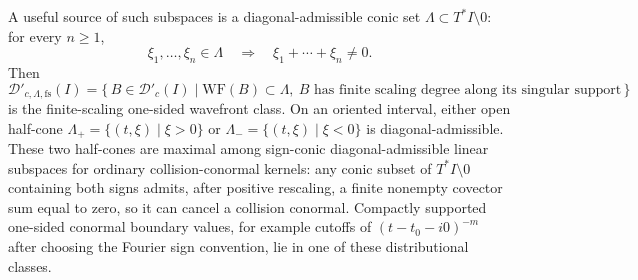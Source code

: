 \begin{defn}
  A useful source of such subspaces is a diagonal-admissible conic set
  \(\Lambda\subset T^*I\setminus0\): for every \(n\geq1\),
  \[
    \xi_1,\ldots,\xi_n\in\Lambda
    \quad\Longrightarrow\quad
    \xi_1+\cdots+\xi_n\neq0 .
  \]
  Then
  \[
    \mathcal D'_{c,\Lambda,\mathrm{fs}}(I)
      =
      \{\,B\in\mathcal D'_c(I)\mid
      \mathrm{WF}(B)\subset\Lambda,\ B
      \text{ has finite scaling degree along its singular support}\,\}
  \]
  is the finite-scaling one-sided wavefront class.  On an oriented
  interval, either open half-cone
  \(\Lambda_+=\{(t,\xi)\mid \xi>0\}\) or
  \(\Lambda_-=\{(t,\xi)\mid \xi<0\}\) is diagonal-admissible.
  These two half-cones are maximal among sign-conic diagonal-admissible
  linear subspaces for ordinary collision-conormal kernels: any conic
  subset of \(T^*I\setminus0\) containing both signs admits, after
  positive rescaling, a finite nonempty covector sum equal to zero, so it
  can cancel a collision conormal.
  Compactly supported one-sided conormal boundary values, for example
  cutoffs of \((t-t_0-i0)^{-m}\) after choosing the Fourier sign
  convention, lie in one of these distributional classes.
\end{defn}

